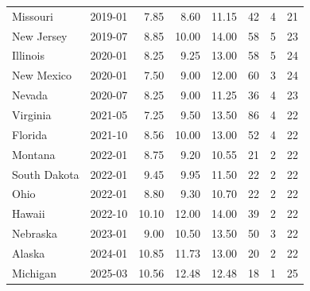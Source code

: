 \begin{tabular}{llrrrrrr}
Missouri & 2019-01 & 7.85 & 8.60 & 11.15 & 42 & 4 & 21 \\
New Jersey & 2019-07 & 8.85 & 10.00 & 14.00 & 58 & 5 & 23 \\
Illinois & 2020-01 & 8.25 & 9.25 & 13.00 & 58 & 5 & 24 \\
New Mexico & 2020-01 & 7.50 & 9.00 & 12.00 & 60 & 3 & 24 \\
Nevada & 2020-07 & 8.25 & 9.00 & 11.25 & 36 & 4 & 23 \\
Virginia & 2021-05 & 7.25 & 9.50 & 13.50 & 86 & 4 & 22 \\
Florida & 2021-10 & 8.56 & 10.00 & 13.00 & 52 & 4 & 22 \\
Montana & 2022-01 & 8.75 & 9.20 & 10.55 & 21 & 2 & 22 \\
South Dakota & 2022-01 & 9.45 & 9.95 & 11.50 & 22 & 2 & 22 \\
Ohio & 2022-01 & 8.80 & 9.30 & 10.70 & 22 & 2 & 22 \\
Hawaii & 2022-10 & 10.10 & 12.00 & 14.00 & 39 & 2 & 22 \\
Nebraska & 2023-01 & 9.00 & 10.50 & 13.50 & 50 & 3 & 22 \\
Alaska & 2024-01 & 10.85 & 11.73 & 13.00 & 20 & 2 & 22 \\
Michigan & 2025-03 & 10.56 & 12.48 & 12.48 & 18 & 1 & 25 \\
\bottomrule
\end{tabular}
